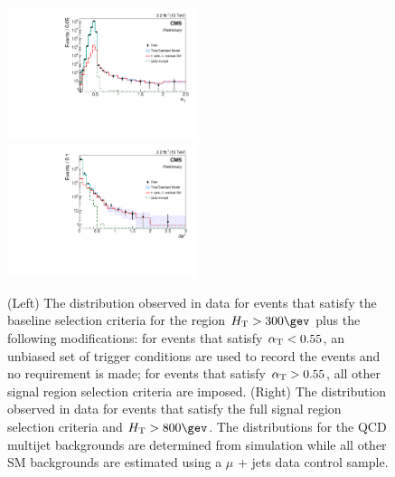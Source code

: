 \begin{figure}[tbhp]
  \begin{center}
    \includegraphics[width=0.49\textwidth]{alphaT_v4} \,
    \includegraphics[width=0.49\textwidth]{bDPhi_v4} \\
  \end{center}
  \caption{(Left) The \alphat distribution observed in data for events
    that satisfy the baseline selection criteria for the region
    $\scalht > 300\gev$ plus the following modifications: for events
    that satisfy $\alphat < 0.55$, an unbiased set of \scalht trigger
    conditions are used to record the events and no \mht requirement
    is made; for events that satisfy $\alphat > 0.55$, all other
    signal region selection criteria are imposed. (Right) The
    \dphi distribution observed in data for events that satisfy the
    full signal region selection criteria and $\scalht > 800\gev$.
    The distributions for the QCD multijet backgrounds are determined
    from simulation while all other SM backgrounds are estimated using
    a $\mu$ + jets data control sample. %
    \label{fig:alphat-bdphi} 
  }
\end{figure}


